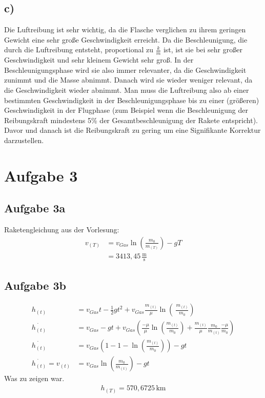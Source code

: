 \documentclass[a4paper,10pt]{extarticle}
\begin{document}
\subsection*{c)}
Die Luftreibung ist sehr wichtig, da die Flasche verglichen zu ihrem geringen Gewicht eine sehr große Geschwindigkeit erreicht. Da die Beschleunigung, die durch die Luftreibung entsteht, proportional zu $\frac{k}{m}$ ist, ist sie bei sehr großer Geschwindigkeit und sehr kleinem Gewicht sehr groß. In der Beschleunigungsphase wird sie also immer relevanter, da die Geschwindigkeit zunimmt und die Masse abnimmt. Danach wird sie wieder weniger relevant, da die Geschwindigkeit wieder abnimmt. Man muss die Luftreibung also ab einer bestimmten Geschwindigkeit in der Beschleunigungsphase bis zu einer (größeren) Geschwindigkeit in der Flugphase (zum Beispiel wenn die Beschleunigung der Reibungskraft mindestens 5\% der Gesamtbeschleunigung der Rakete entspricht). Davor und danach ist die Reibungskraft zu gering um eine Signifikante Korrektur darzustellen.

\section*{Aufgabe 3}
\subsection*{Aufgabe 3a}
Raketengleichung aus der Vorlesung:
\begin{align*}
v_{(T)} &= v_{Gas}\ln\left( \frac{m_0}{m_{(T)}}\right) - gT \\
&= 3413,45\,\frac{\mbox{m}}{\mbox{s}}
\end{align*}

\subsection*{Aufgabe 3b}
\begin{align*}
h_{(t)} &= v_{Gas}t - \frac{1}{2}gt^2 + v_{Gas} \frac{m_{(t)}}{\mu}\ln\left(\ \frac{m_{(t)}}{m_0} \right) \\
\dot{h_{(t)}} &= v_{Gas} - gt + v_{Gas} \left(\frac{- \mu}{\mu} \ln \left( \frac{m_{(t)}}{m_0}\right) + \frac{m_{(t)}}{\mu} \frac{m_0}{m_{(t)}} \frac{- \mu}{m_0} \right) \\
\dot{h_{(t)}} &= v_{Gas} \left(1-1-\ln \left( \frac{m_{(t)}}{m_0} \right)\right) - gt \\
\dot{h_{(t)}} = v_{(t)} &= v_{Gas} \ln \left( \frac{m_0}{m_{(t)}} \right) - gt
\end{align*}
Was zu zeigen war.
\begin{align*}
h_{(T)} = 570,6725 \, \mbox{km}
\end{align*}
\end{document}
